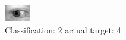 \begin{figure}[h!]
\begin{center}
\includegraphics[width=0.60\columnwidth]{figures/ID847_class_2_target_4.png}
\end{center}
\caption{ Classification: 2 actual target: 4}
\label{fig:ID847_class_2_target_4}
\end{figure}
